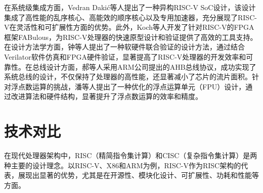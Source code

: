在系统级集成方面，Vedran Dakić等人提出了一种异构RISC-V SoC设计，该设计集成了高性能的乱序核心、高能效的顺序核心以及专用加速器，充分展现了RISC-V在灵活性和可扩展性方面的优势\cite{electronics13173494}。此外，Koch等人开发了针对RISC-V的FPGA框架FABulous，为RISC-V处理器的快速原型设计和验证提供了高效的工具支持\cite{10.1145/3431920}。在设计方法学方面，钟等人提出了一种软硬件联合验证的设计方法，通过结合Verilator软件仿真和FPGA硬件验证，显著提高了RISC-V处理器的开发效率和可靠性\cite{SDDZ202411008}。在总线设计方面，郝等人采用ARM公司提出的AHB总线协议，成功实现了系统总线的设计，不仅保持了处理器的高性能，还显著减小了芯片的流片面积\cite{JSGG202020007}。针对浮点数运算的挑战，潘等人提出了一种优化的浮点运算单元（FPU）设计，通过改进算法和硬件结构，显著提升了浮点数运算的效率和精度\cite{JSGG202103009}。

\section{技术对比}
在现代处理器架构中，RISC（精简指令集计算）和CISC（复杂指令集计算）是两种主要的设计理念。以RISC-V、X86和ARM为例，RISC-V作为RISC架构的代表，展现出显著的优势，尤其是在开源性、模块化设计、可扩展性、功耗和性能等方面。

